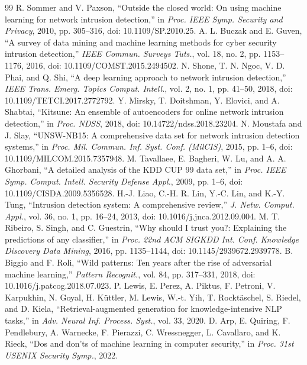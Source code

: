 \documentclass[conference]{IEEEtran}
\begin{document}
\begin{thebibliography}{99}
 R. Sommer and V. Paxson, ``Outside the closed world: On using machine learning for network intrusion detection,'' in \emph{Proc. IEEE Symp. Security and Privacy}, 2010, pp. 305--316, doi: 10.1109/SP.2010.25.
 A. L. Buczak and E. Guven, ``A survey of data mining and machine learning methods for cyber security intrusion detection,'' \emph{IEEE Commun. Surveys Tuts.}, vol. 18, no. 2, pp. 1153--1176, 2016, doi: 10.1109/COMST.2015.2494502.
 N. Shone, T. N. Ngoc, V. D. Phai, and Q. Shi, ``A deep learning approach to network intrusion detection,'' \emph{IEEE Trans. Emerg. Topics Comput. Intell.}, vol. 2, no. 1, pp. 41--50, 2018, doi: 10.1109/TETCI.2017.2772792.
 Y. Mirsky, T. Doitshman, Y. Elovici, and A. Shabtai, ``Kitsune: An ensemble of autoencoders for online network intrusion detection,'' in \emph{Proc. NDSS}, 2018, doi: 10.14722/ndss.2018.23204.
 N. Moustafa and J. Slay, ``UNSW-NB15: A comprehensive data set for network intrusion detection systems,'' in \emph{Proc. Mil. Commun. Inf. Syst. Conf. (MilCIS)}, 2015, pp. 1--6, doi: 10.1109/MILCOM.2015.7357948.
 M. Tavallaee, E. Bagheri, W. Lu, and A. A. Ghorbani, ``A detailed analysis of the KDD CUP 99 data set,'' in \emph{Proc. IEEE Symp. Comput. Intell. Security Defense Appl.}, 2009, pp. 1--6, doi: 10.1109/CISDA.2009.5356528.
 H.-J. Liao, C.-H. R. Lin, Y.-C. Lin, and K.-Y. Tung, ``Intrusion detection system: A comprehensive review,'' \emph{J. Netw. Comput. Appl.}, vol. 36, no. 1, pp. 16--24, 2013, doi: 10.1016/j.jnca.2012.09.004.
 M. T. Ribeiro, S. Singh, and C. Guestrin, ``Why should I trust you?: Explaining the predictions of any classifier,'' in \emph{Proc. 22nd ACM SIGKDD Int. Conf. Knowledge Discovery Data Mining}, 2016, pp. 1135--1144, doi: 10.1145/2939672.2939778.
 B. Biggio and F. Roli, ``Wild patterns: Ten years after the rise of adversarial machine learning,'' \emph{Pattern Recognit.}, vol. 84, pp. 317--331, 2018, doi: 10.1016/j.patcog.2018.07.023.
 P. Lewis, E. Perez, A. Piktus, F. Petroni, V. Karpukhin, N. Goyal, H. Küttler, M. Lewis, W.-t. Yih, T. Rocktäschel, S. Riedel, and D. Kiela, ``Retrieval-augmented generation for knowledge-intensive NLP tasks,'' in \emph{Adv. Neural Inf. Process. Syst.}, vol. 33, 2020.
 D. Arp, E. Quiring, F. Pendlebury, A. Warnecke, F. Pierazzi, C. Wressnegger, L. Cavallaro, and K. Rieck, ``Dos and don'ts of machine learning in computer security,'' in \emph{Proc. 31st USENIX Security Symp.}, 2022.
\end{thebibliography}
\end{document}
